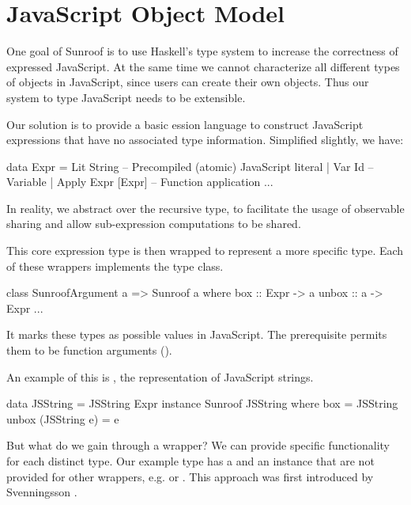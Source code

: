  
\section{JavaScript Object Model}
\label{sec:object-model}

One goal of Sunroof is to use Haskell's type system to
increase the correctness of expressed JavaScript.
At the same time we cannot characterize 
all different types of objects in JavaScript, since 
users can create their own objects. Thus our 
system to type JavaScript needs to be extensible.

Our solution is to provide a basic ession
language to construct JavaScript expressions 
that have no associated type information. Simplified slightly, we have:
\begin{Code}
data Expr 
  = Lit String        -- Precompiled (atomic) JavaScript literal
  | Var Id            -- Variable
  | Apply Expr [Expr] -- Function application
  ...
\end{Code}
In reality, we abstract  over the recursive type,
to facilitate the usage of observable sharing \cite{Gill:09:TypeSafeReification}
and allow sub-expression computations to be shared.

This core expression type 
is then wrapped to represent a more specific type. 
Each of these wrappers implements the  type class.
\begin{Code}
class SunroofArgument a => Sunroof a where
  box   :: Expr -> a
  unbox :: a -> Expr
  ...
\end{Code}
It marks these types as possible values in JavaScript.
The  prerequisite permits them 
to be function arguments ().

An example of this is , the representation
of JavaScript strings.
\begin{Code}
data JSString = JSString Expr
instance Sunroof JSString where
  box                = JSString
  unbox (JSString e) = e
\end{Code}
But what do we gain through a wrapper? We can
provide specific functionality for each distinct type.
Our example type  has a  and an 
 instance that are not provided for other 
wrappers, e.g.  or .
This approach was first introduced by 
Svenningsson \cite{Svenningsson:12:CombiningEmbedding}.

